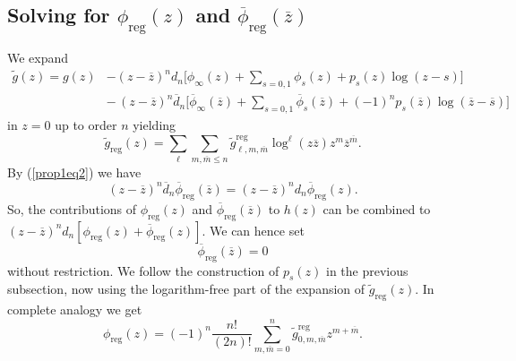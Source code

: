 \documentclass[oneside]{amsart}
\newcommand{\ddd}{{\overline{d}}}
\newcommand{\mm}{{\overline{m}}}
\newcommand{\sss}{{\overline{s}}}
\newcommand{\zz}{{\overline{z}}}
\theoremstyle{plain}
\begin{document}
\subsection{Solving for \texorpdfstring{$\phi_\text{reg}(z)$}{phiref(z)} and \texorpdfstring{$\overline{\phi}_\text{reg}(\zz)$}{phirefbar(zbar)}}
We expand
\begin{align*}
\widetilde{g}(z)=g(z)&-(z-\zz)^nd_n\Big[\phi_\infty(z)+\sum_{s=0,1}\phi_s(z)+p_s(z)\log(z-s)\Big]\\
&-\,(z-\zz)^n\ddd_n\Big[\overline{\phi}_\infty(\zz)+\sum_{s=0,1}\overline{\phi}_s(\zz)+(-1)^np_s(\zz)\log(\zz-\sss)\Big]
\end{align*}
in $z=0$ up to order $n$ yielding
$$
\widetilde{g}_\text{reg}(z)=\sum_\ell\sum_{m,\mm\leq n}\widetilde{g}^\text{reg}_{\ell,m,\mm}\log^\ell(z\zz)z^m\zz^\mm.
$$
By (\ref{prop1eq2}) we have
$$
(z-\zz)^n\ddd_n\overline{\phi}_\text{reg}(\zz)=(z-\zz)^nd_n\overline{\phi}_\text{reg}(z).
$$
So, the contributions of $\phi_\text{reg}(z)$ and $\overline{\phi}_\text{reg}(\zz)$ to $h(z)$ can be combined to $(z-\zz)^nd_n[\phi_\text{reg}(z)+\overline{\phi}_\text{reg}(z)]$.
We can hence set
$$
\overline{\phi}_{\mathrm{reg}}(\zz)=0
$$
without restriction. We follow the construction of $p_s(z)$ in the previous subsection, now using the logarithm-free part of the expansion of $\widetilde{g}_\text{reg}(z)$.
In complete analogy we get
$$
\phi_\text{reg}(z)=(-1)^n\frac{n!}{(2n)!}\sum_{m,\mm=0}^n\widetilde{g}^\text{reg}_{0,m,\mm}z^{m+\mm}.
$$
\end{document}
